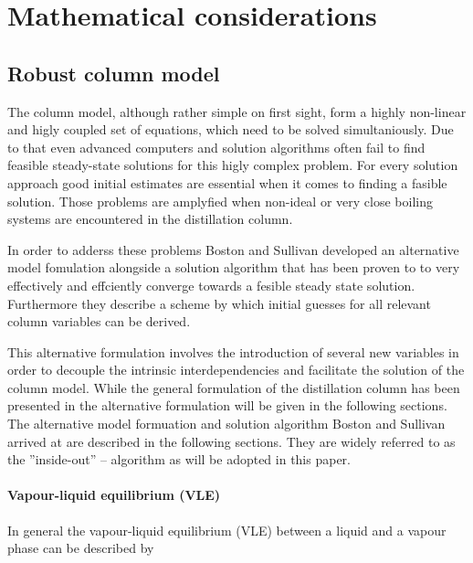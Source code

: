 \chapter{Mathematical considerations}
\label{chp:MathModel}

\section{Robust column model}
The column model, although rather simple on first sight, form a highly non-linear
and higly coupled set of equations, which need to be solved simultaniously. Due
to that even advanced computers and solution algorithms often fail to find feasible 
steady-state solutions for this higly complex problem. For every solution approach 
good initial estimates are essential when it comes to finding a fasible solution. 
Those problems are amplyfied when non-ideal or very close boiling systems are encountered
in the distillation column. 

In order to adderss these problems Boston and Sullivan \cite{Boston.1974} developed an 
alternative model fomulation alongside a solution algorithm that has been proven to 
to very effectively and effciently converge towards a fesible steady state solution. 
Furthermore they describe a scheme by which initial guesses for all relevant column 
variables can be derived. 

This alternative formulation involves the introduction of several new variables 
in order to decouple the intrinsic interdependencies and facilitate the solution 
of the column model. While the general formulation of the distillation column 
has been presented in  the alternative formulation will be 
given in the following sections. The alternative model formuation and solution
algorithm Boston and Sullivan arrived at are described in the following sections. 
They are widely referred to as the ''inside-out'' -- algorithm as will be adopted 
in this paper. 
 
\subsubsection{Vapour-liquid equilibrium (VLE)}
In general the vapour-liquid equilibrium (VLE) between a liquid and a vapour phase 
can be described by \cite{AndreasPfennig.2003}

